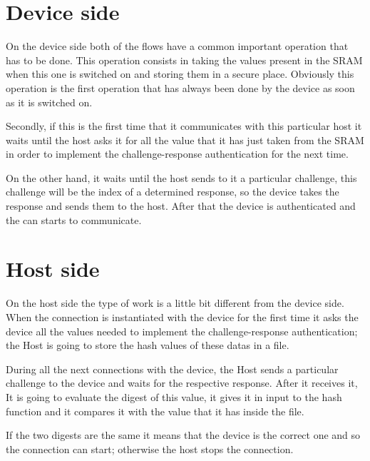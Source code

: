 \section {Device side} 
On the device side both of the flows have a common important operation that has to be done. This operation consists in taking the values present in the SRAM when this one is switched on and storing them in a secure place. Obviously this operation is the first operation that has always been done by the device as soon as it is switched on.

Secondly, if this is the first time that it communicates with this particular host it waits until the host asks it for all the value that it has just taken from the SRAM in order to implement the challenge-response authentication for the next time.

On the other hand, it waits until the host sends to it a particular challenge, this challenge will be the index of a determined response, so the device takes the response and sends them to the host.
After that the device is authenticated and the can starts to communicate.



\section {Host side} 
On the host side the type of work is a little bit different from the device side.
When the connection is instantiated with the device for the first time it asks the device all the values needed to implement the challenge-response authentication; the Host is going to store the hash values of these datas in a file.

During all the next connections with the device, the Host sends a particular challenge to the device and waits for the respective response.
After it receives it, It is going to evaluate the digest of this value, it gives it in input to the hash function and it compares it with the value that it has inside the file.

If the two digests are the same it means that the device is the correct one and so the connection can start; otherwise the host stops the connection.



